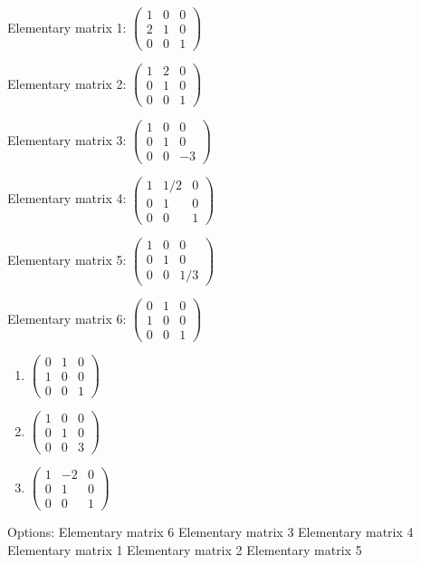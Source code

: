 \documentclass[10pt,a4paper]{article}
\begin{document}
Elementary matrix 1: \(\begin{pmatrix}1&0&0\\2&1&0\\0&0&1\end{pmatrix}\)

Elementary matrix 2: \(\begin{pmatrix}1&2&0\\0&1&0\\0&0&1\end{pmatrix}\)

Elementary matrix 3: \(\begin{pmatrix}1&0&0\\0&1&0\\0&0&-3\end{pmatrix}\)

Elementary matrix 4: \(\begin{pmatrix}1&1/2&0\\0&1&0\\0&0&1\end{pmatrix}\)

Elementary matrix 5: \(\begin{pmatrix}1&0&0\\0&1&0\\0&0&1/3\end{pmatrix}\)

Elementary matrix 6: \(\begin{pmatrix}0&1&0\\1&0&0\\0&0&1\end{pmatrix}\)

\begin{enumerate}[label=(\alph*)]
\item \(\begin{pmatrix}0&1&0\\1&0&0\\0&0&1\end{pmatrix}\)
\item \(\begin{pmatrix}1&0&0\\0&1&0\\0&0&3\end{pmatrix}\)
\item \(\begin{pmatrix}1&-2&0\\0&1&0\\0&0&1\end{pmatrix}\)
\end{enumerate}
\quad Options: Elementary matrix 6 \textbar{} Elementary matrix 3 \textbar{} Elementary matrix 4 \textbar{} Elementary matrix 1 \textbar{} Elementary matrix 2 \textbar{} Elementary matrix 5
\end{document}
